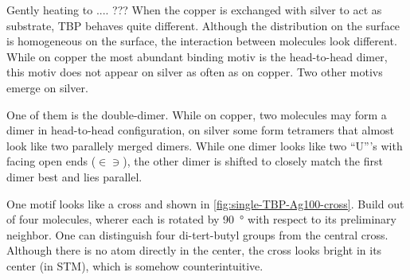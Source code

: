 Gently heating to  .... ???
When the copper is exchanged with silver to act as substrate, TBP behaves quite different. Although the distribution on the surface is homogeneous on the surface, the interaction between molecules look different. While on copper the most abundant binding motiv is the head-to-head dimer, this motiv does not appear on silver as often as on copper. Two other motivs emerge on silver.

One of them is the double-dimer.  While on copper, two molecules may form a dimer in head-to-head configuration, on silver some form tetramers that almost look like two parallely merged dimers. While one dimer looks like two ``U'''s with facing open ends ($\in \ni$), the other dimer is shifted to closely match the first dimer best and lies parallel.


One motif looks like a cross and shown in \autoref{fig:single-TBP-Ag100-cross}. Build out of four molecules, wherer each is rotated by \SI{90}{\degree} with respect to its preliminary neighbor. One can distinguish four di-tert-butyl groups from the central cross. Although there is no atom directly in the center, the cross looks bright in its center (in STM), which is somehow counterintuitive. 

